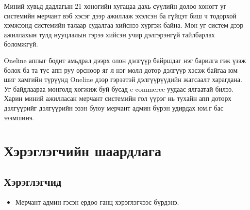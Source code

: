 Миний хувьд дадлагын 21 хоногийн хугацаа дахь сүүлийн долоо хоногт уг системийн мерчант вэб хэсэг дээр ажиллаж эхэлсэн ба гүйцэт биш ч тодорхой хэмжээнд системийн талаар судалгаа хийснээ хүргэж байна. Мөн уг систем дээр ажиллахын тулд нууцлалын гэрээ хийсэн учир дэлгэрэнгүй тайлбарлах боломжгүй. 

\quad \quad Oneline аппыг бодит амьдрал дээрх олон дэлгүүр байршдаг нэг барилга гэж үзэж болох ба та тус апп руу орсноор яг л нэг молл дотор дэлгүүр хэсэж байгаа юм шиг хамгийн түрүүнд Oneline дээр гэрээтэй дэлгүүрүүдийн жагсаалт харагдана. Уг байдлаараа монголд хөгжиж буй бусад  e-commerce-уудаас ялгаатай билээ. Харин миний ажилласан мерчант системийн гол үүрэг нь тухайн апп доторх дэлгүүрийг дэлгүүрийн эзэн буюу мерчант админ бүрэн удирдах юм.г бас эзэмшинэ.
    \section{Хэрэглэгчийн шаардлага}
    \subsection{Хэрэглэгчид}
    \begin{itemize}
        \item Мерчант админ гэсэн ердөө ганц хэрэглэгчээс бүрдэнэ.
    \end{itemize}
